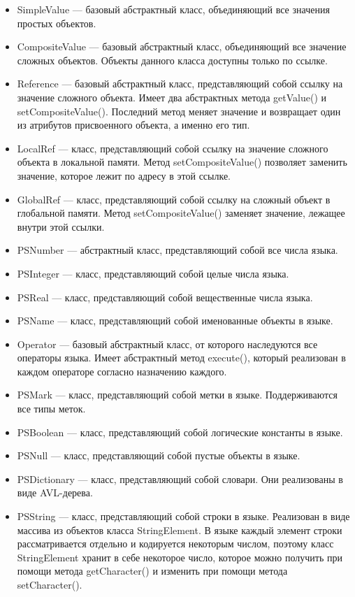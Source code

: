 \documentclass[14pt]{extarticle}
\begin{document}
\begin{itemize}
\item SimpleValue ---  базовый абстрактный класс, объединяющий все значения простых объектов.
\item CompositeValue --- базовый абстрактный класс, объединяющий все значение сложных объектов. Объекты данного класса доступны только по ссылке.
\item Reference --- базовый абстрактный класс, представляющий собой ссылку на значение сложного объекта. Имеет два абстрактных метода getValue() и setCompositeValue(). Последний метод меняет значение и возвращает один из атрибутов присвоенного объекта, а именно его тип.
\item LocalRef ---  класс, представляющий собой ссылку на значение сложного объекта в локальной памяти. Метод setCompositeValue() позволяет заменить значение, которое лежит по адресу в этой ссылке.
\item GlobalRef ---  класс, представляющий собой ссылку на сложный объект в глобальной памяти. Метод setCompositeValue() заменяет значение, лежащее внутри этой ссылки.
\item PSNumber --- абстрактный класс, представляющий собой все числа языка.
\item PSInteger --- класс, представляющий собой целые числа языка.
\item PSReal --- класс, представляющий собой вещественные числа языка.
\item PSName ---  класс, представляющий собой именованные объекты в языке.
\item Operator --- базовый абстрактный класс, от которого наследуются все операторы языка. Имеет абстрактный метод execute(), который реализован в каждом операторе согласно назначению каждого.
\item PSMark ---  класс, представляющий собой метки в языке. Поддерживаются все типы меток.
\item PSBoolean ---  класс, представляющий собой логические константы в языке.
\item PSNull ---  класс, представляющий собой пустые объекты в языке.
\item PSDictionary ---  класс, представляющий собой словари. Они реализованы в виде AVL-дерева.
\item PSString ---  класс, представляющий собой строки в языке. Реализован в виде массива из объектов класса StringElement. В языке каждый элемент строки рассматривается отдельно и кодируется некоторым числом, поэтому класс StringElement хранит в себе некоторое число, которое можно получить при помощи метода getCharacter() и изменить при помощи метода setCharacter().

\end{itemize}
\end{document}
